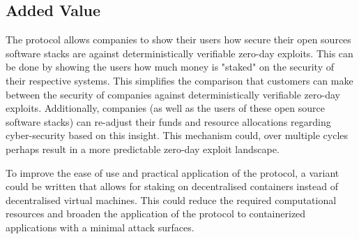 \subsection{Added Value}
The protocol allows companies to show their users how secure their open sources software stacks are against deterministically verifiable zero-day exploits. This can be done by showing the users how much money is "staked" on the security of their respective systems. This simplifies the comparison that customers can make between the security of companies against deterministically verifiable zero-day exploits. Additionally, companies (as well as the users of these open source software stacks) can re-adjust their funds and resource allocations regarding cyber-security based on this insight. This mechanism could, over multiple cycles perhaps result in a more predictable zero-day exploit landscape.

To improve the ease of use and practical application of the protocol, a variant could be written that allows for staking on decentralised containers instead of decentralised virtual machines. This could reduce the required computational resources and broaden the application of the protocol to containerized applications with a minimal attack surfaces.